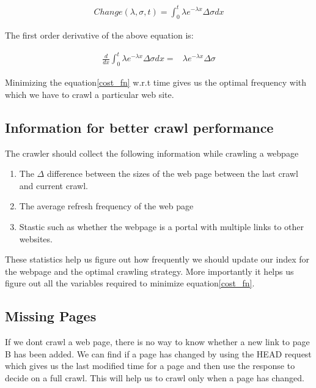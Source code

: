 \documentclass{article}
\begin{document}
\begin{align}
  \label{change_eq}
  Change(\lambda, \sigma, t) = \int_{0}^{t} \lambda e^{-\lambda x}\Delta\sigma dx
\end{align}

The first order derivative of the above equation is:

\begin{align}
  \label{cost_fn}
  \frac{d}{dx} \int_{0}^{t} \lambda e^{-\lambda x} \Delta \sigma dx =& \lambda e^{-\lambda x}\Delta\sigma
\end{align}

Minimizing the equation\eqref{cost_fn} w.r.t time gives us the optimal frequency with which we have to crawl a particular web site.

\subsection{Information for better crawl performance}
The crawler should collect the following information while crawling a webpage
\begin{enumerate}
  \item The $\Delta $ difference between the sizes of the web page between the last crawl and current crawl.
  \item The average refresh frequency of the web page
  \item Stastic such as whether the webpage is a portal with multiple links to other websites.
\end{enumerate}
These statistics help us figure out how frequently we should update our index for the webpage and the optimal crawling strategy.  More importantly it helps us figure out all the variables required to minimize equation\eqref{cost_fn}.

\subsection{Missing Pages}
If we dont crawl a web page, there is no way to know whether a new link to page B has been added.  We can find if a page has changed by using the HEAD request which gives us the last modified time for a page and then use the response to decide on a full crawl.  This will help us to crawl only when a page has changed.
\end{document}
